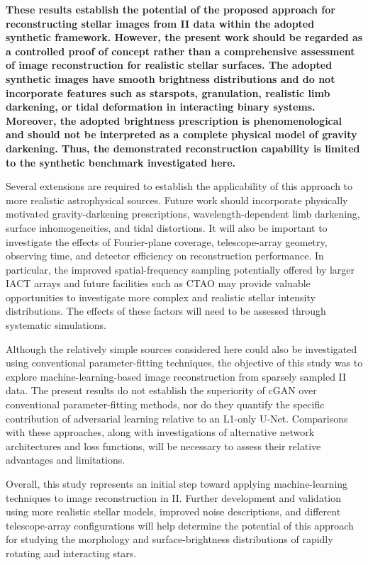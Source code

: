 {\bf These results establish the potential of the proposed approach for reconstructing stellar images from II data within the adopted synthetic framework. However, the present work should be regarded as a controlled proof of concept rather than a comprehensive assessment of image reconstruction for realistic stellar surfaces. The adopted synthetic images have smooth brightness distributions and do not incorporate features such as starspots, granulation, realistic limb darkening, or tidal deformation in interacting binary systems. Moreover, the adopted brightness prescription is phenomenological and should not be interpreted as a complete physical model of gravity darkening. Thus, the demonstrated reconstruction capability is limited to the synthetic benchmark investigated here.

Several extensions are required to establish the applicability of this approach to more realistic astrophysical sources. Future work should incorporate physically motivated gravity-darkening prescriptions, wavelength-dependent limb darkening, surface inhomogeneities, and tidal distortions. It will also be important to investigate the effects of Fourier-plane coverage, telescope-array geometry, observing time, and detector efficiency on reconstruction performance. In particular, the improved spatial-frequency sampling potentially offered by larger IACT arrays and future facilities such as CTAO may provide valuable opportunities to investigate more complex and realistic stellar intensity distributions. The effects of these factors will need to be assessed through systematic simulations.

Although the relatively simple sources considered here could also be investigated using conventional parameter-fitting techniques, the objective of this study was to explore machine-learning-based image reconstruction from sparsely sampled II data. The present results do not establish the superiority of cGAN over conventional parameter-fitting methods, nor do they quantify the specific contribution of adversarial learning relative to an L1-only U-Net. Comparisons with these approaches, along with investigations of alternative network architectures and loss functions, will be necessary to assess their relative advantages and limitations.}

Overall, this study represents an initial step toward applying machine-learning techniques to image reconstruction in II. Further development and validation using more realistic stellar models, improved noise descriptions, and different telescope-array configurations will help determine the potential of this approach for studying the morphology and surface-brightness distributions of rapidly rotating and interacting stars.